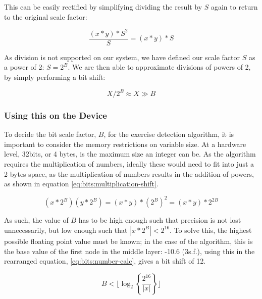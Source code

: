 This can be easily rectified by simplifying dividing the result by $S$ again to return to the original scale factor:

\begin{equation}
\label{eq:bits:rescale}
\frac{(x*y)*S^2}{S}=(x*y)*S
\end{equation}

As division is not supported on our system, we have defined our scale factor $S$ as a power of 2: $S=2^B$. We are then able to approximate divisions of powers of 2, by simply performing a bit shift:

\begin{equation}
\label{eq:bits:div_approx}
X/2^B\approx X \gg B
\end{equation}

\subsubsection{Using this on the Device}

To decide the bit scale factor, $B$, for the exercise detection algorithm, it is important to consider the memory restrictions on variable size. At a hardware level, 32bits, or 4 bytes, is the maximum size an integer can be. As the algorithm requires the multiplication of numbers, ideally these would need to fit into just a 2 bytes space, as the multiplication of numbers results in the addition of powers, as shown in equation \ref{eq:bits:multiplication-shift}.

\begin{equation}
\label{eq:bits:multiplication-shift}
(x*2^B)(y*2^B)=(x*y)*(2^B)^2=(x*y)*2^{2B}
\end{equation}

As such, the value of $B$ has to be high enough such that precision is not lost unnecessarily, but low enough such that $|x*2^B|<2^{16}$. To solve this, the highest possible floating point value must be known; in the case of the algorithm, this is the base value of the first node in the middle layer: -10.6 (3s.f.), using this in the rearranged equation, \ref{eq:bits:number-calc}, gives a bit shift of 12.

\begin{equation}
\label{eq:bits:number-calc}
B<\lfloor\log_{2}\left\{\frac{2^{16}}{|x|}\right\}\rfloor
\end{equation}
